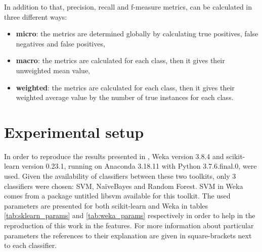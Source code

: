 In addition to that, precision, recall and f-measure metrics, can be calculated in three different ways:

\begin{itemize}
    \item \textbf{micro}: the metrics are determined globally by calculating true positives, false negatives and false positives,
    \item \textbf{macro}: the metrics are calculated for each class, then it gives their unweighted mean value,
    \item \textbf{weighted}: the metrics are calculated for each class, then it gives their weighted average value by the number of true instances for each class.
\end{itemize}

\section{Experimental setup}
In order to reproduce the results presented in \cite{borges_hink_machine_2014-1}, Weka version 3.8.4 and scikit-learn version 0.23.1, running on Anaconda 3.18.11 with Python 3.7.6.final.0, were used. Given the availability of classifiers between these two toolkits, only 3 classifiers were chosen: SVM, NaïveBayes and Random Forest. SVM in Weka comes from a package untitled libsvm available for this toolkit. The used parameters are presented for both scikit-learn and Weka in tables \ref{tab:sklearn_params} and \ref{tab:weka_params} respectively in order to help in the reproduction of this work in the features. For more information about particular parameters the references to their explanation are given in square-brackets next to each classifier.

